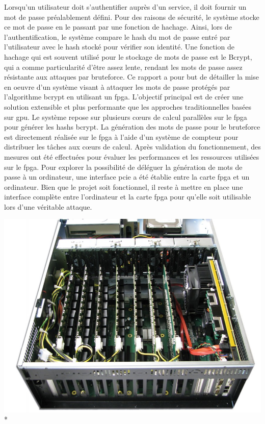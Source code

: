 \begin{spacing}{0.956}
\vspace{0.5cm}

Lorsqu'un utilisateur doit s'authentifier auprès d'un service, il doit fournir un mot de passe préalablement défini. 
Pour des raisons de sécurité, le système stocke ce mot de passe en le passant par une fonction de hachage. 
Ainsi, lors de l'authentification, le système compare le hash du mot de passe entré par l'utilisateur avec le hash stocké pour vérifier son identité. 
Une fonction de hachage qui est souvent utilisé pour le stockage de mots de passe est le Bcrypt, qui a comme particularité d'être assez lente, rendant les mots de passe assez résistante aux attaques par bruteforce. 
Ce rapport a pour but de détailler la mise en oeuvre d'un système visant à attaquer les mots de passe protégés par l'algorithme bcrypt en utilisant un \gls{fpga}. 
L'objectif principal est de créer une solution extensible et plus performante que les approches traditionnelles basées sur \gls{gpu}. 
Le système repose sur plusieurs cœurs de calcul parallèles sur le \gls{fpga} pour générer les hashs bcrypt. 
La génération des mots de passe pour le bruteforce est directement réalisée sur le \gls{fpga} à l'aide d'un système de compteur pour distribuer les tâches aux cœurs de calcul. 
Après validation du fonctionnement, des mesures ont été effectuées pour évaluer les performances et les ressources utilisées sur le \gls{fpga}. 
Pour explorer la possibilité de déléguer la génération de mots de passe à un ordinateur, une interface \gls{pcie} a été établie entre la carte \gls{fpga} et un ordinateur. 
Bien que le projet soit fonctionnel, il reste à mettre en place une interface complète entre l'ordinateur et la carte \gls{fpga} pour qu'elle soit utilisable lors d'une véritable attaque.

\vfill
\begin{center}
	{\includegraphics[width=0.5\linewidth]{figures/fpga_cluster}}\\*
\vfill


\end{center}
\end{spacing}
